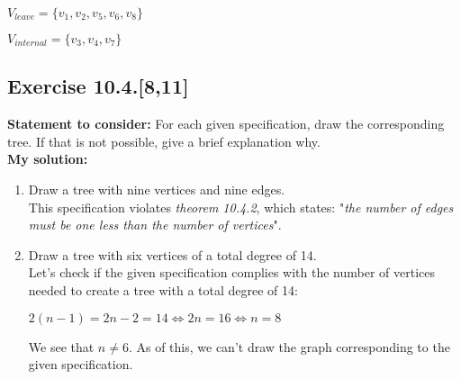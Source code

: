 \documentclass{report}
\newcommand{\cent}[1]{\begin{center}#1\end{center}}
\newcommand{\assignmentDescription}{\textbf{Statement to consider: }}
\newcommand{\solution}{\textbf{My solution: }}
\newcommand{\Exercise}[1]{\subsection{Exercise #1}}
\newcommand{\defaultEnumerateLabel}{\textbf{\alph*.}}
\newcommand{\myItem}[1]{\item #1\\}
\begin{document}
	\cent{$V_{leave} = \{v_1, v_2, v_5, v_6,v_8\}$}
	\cent{$V_{internal} = \{v_3,v_4,v_7\}$}
	
	\Exercise{10.4.[8,11]}
	
	\assignmentDescription
	For each given specification, draw the corresponding tree. If that is not possible, give a brief explanation why.\\
	
	\solution
	
	\begin{enumerate}[label=\defaultEnumerateLabel]
		\myItem{Draw a tree with nine vertices and nine edges.}
		
		This specification violates \textit{theorem 10.4.2}, which states: "\textit{the number of edges must be one less than the number of vertices}". 
		
		\myItem{Draw a tree with six vertices of a total degree of 14.}
		
		Let's check if the given specification complies with the number of vertices needed to create a tree with a total degree of 14:
		
		\cent{$ 2(n-1) = 2n -2 = 14  \Leftrightarrow  2n = 16 \Leftrightarrow n=8 $}
		
		We see that $n \neq 6$. As of this, we can't draw the graph corresponding to the given specification.
	\end{enumerate}
\end{document}
